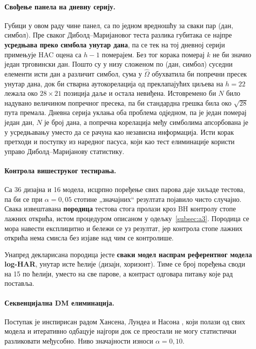 \paragraph{Свођење панела на дневну серију.}
Губици у овом раду чине панел, са по једном вредношћу за сваки пар (дан, симбол). Пре сваког
Диболд–Маријановог теста разлика губитака се најпре \textbf{усредњава преко симбола
унутар дана}, па се тек на тој дневној серији примењује HAC оцена са $h-1$ померајем.
Без тог корака померај $k$ не би значио један трговински дан. Пошто су у низу сложеном
по (дан, симбол) суседни елементи исти дан а различит симбол, сума у $\hat{\Omega}$
обухватила би попречни пресек унутар дана, док би стварна аутокорелација од
преклапајућих циљева на $h = 22$ лежала око $28 \times 21$ позиција даље и остала
невиђена. Истовремено би $N$ било надувано величином попречног пресека, па би
стандардна грешка била око $\sqrt{28}$ пута премала. Дневна серија уклања оба проблема
одједном, па је један померај један дан, $N$ је број дана, а попречна корелација међу
симболима апсорбована је у усредњавању уместо да се рачуна као независна информација.
Исти корак претходи и поступку из наредног пасуса, који као тест елиминације користи
управо Диболд–Маријанову статистику.

\paragraph{Контрола вишеструког тестирања.}
Са 36 дизајна и 16 модела, исцрпно поређење свих парова даје
хиљаде тестова, па би се при $\alpha = 0{,}05$ стотине „значајних“ резултата појавило
чисто случајно. Свака извештавана \textbf{породица} тестова стога пролази кроз
BH контролу стопе лажних открића, истом процедуром описаном у
одељку~\ref{subsec:a3}. Породица се мора навести експлицитно и бележи се уз резултат,
јер контрола стопе лажних открића нема смисла без изјаве над чим се контролише.

Унапред декларисана породица јесте \textbf{сваки модел наспрам референтног
модела log-HAR}, унутар исте ћелије (дизајн, хоризонт). Тиме се број поређења своди
на 15 по ћелији, уместо на све парове, а контраст одговара питању које рад
поставља.

\paragraph{Секвенцијална DM елиминација.}
Поступак је инспирисан радом Хансена, Лундеа и Насона \parencite{hansen2011}, који
полази од свих модела и итеративно одбацује најгори док се преостали не могу
статистички разликовати међусобно. Ниво значајности износи $\alpha = 0{,}10$.

